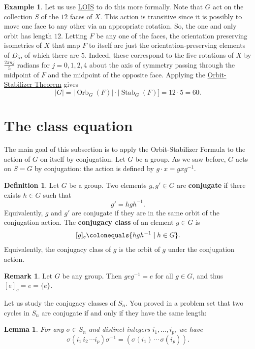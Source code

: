 \documentclass[12pt]{report}
\newtheorem{lemma}[theorem]{Lemma}
\numberwithin{equation}{section}
\numberwithin{theorem}{chapter}
\theoremstyle{definition}
\newtheorem{definition}[theorem]{Definition}
\newtheorem{example}[theorem]{Example}
\newtheorem*{basic properties}{Basic Properties}
\newtheorem*{Important Remark}{Important Remark}
\newtheorem{remark}[theorem]{Remark}
\newcommand{\df}[1]{{\bf #1}\index{#1}}
\DeclareMathOperator{\Orb}{Orb}
\DeclareMathOperator{\Stab}{Stab}
\begin{document}
\begin{example}
Let us use \hyperref[lois]{LOIS} to do this more formally. Note that $G$ act on the collection $S$ of the $12$ faces of $X$. This action is transitive since it is possibly to move one face to any other via an appropriate rotation. So, the one and only orbit has length $12$. Letting $F$ be any one of the faces, the orientation preserving isometries of $X$ that map $F$ to itself are just the orientation-preserving elements of $D_{5}$, of which there are $5$. Indeed, these correspond to the five rotations of $X$ by $\frac{2 \pi n j}{5}$ radians for $j =0,1,2,4$ about the axis of symmetry passing through the midpoint of $F$ and the midpoint of the opposite face.
  Applying the \hyperref[Orbit-Stabilizer Theorem]{Orbit-Stabilizer Theorem} gives
$$|G|=|\Orb_G(F)|\cdot |\Stab_G(F)]=12 \cdot 5=60.$$
\end{example}





\section{The class equation}

The main goal of this subsection is to apply the Orbit-Stabilizer Formula to the action of $G$ on itself by conjugation. 
Let $G$ be a group. As we saw before, $G$ acts on $S = G$ by conjugation: the action is defined by $g \cdot x=gxg^{-1}$.

\begin{definition}
Let $G$ be a group. Two elements $g,g' \in G$ are {\bf conjugate} if there exists $h \in G$ such that 
$$g' = hgh^{-1}.$$
Equivalently, $g$ and $g'$ are conjugate if they are in the same orbit of the conjugation action. The \df{conjugacy class} of an element $g \in G$ is 
$$[g]_c \colonequals \{hgh^{-1} \mid h \in G\}.$$ 
Equivalently, the conjugacy class of $g$ is the orbit of $g$ under the conjugation action. 
\end{definition}


\begin{remark}
	Let $G$ be any group. Then $geg^{-1} = e$ for all $g \in G$, and thus $[e]_c=e = \{ e \}$.
\end{remark}

Let us study the conjugacy classes of $S_n$. You proved in a problem set that two cycles in $S_n$ are conjugate if and only if they have the same length:

\begin{lemma}\label{lemma conjugates cycles} 
For any $\sigma \in S_n$ and distinct integers $i_1, \dots, i_p$, we have
$$\sigma (i_1 \, i_2 \, \cdots i_p) \sigma^{-1} = (\sigma(i_1) \, \cdots \, \sigma(i_p)).$$
\end{lemma}
\end{document}
